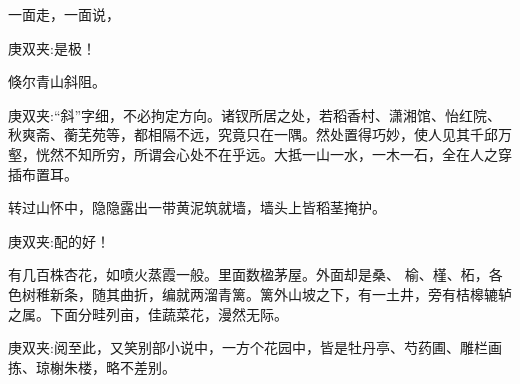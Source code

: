 \begin{parag}
    一面走，一面说，\begin{note}庚双夹:是极！\end{note}倏尔青山斜阻。\begin{note}庚双夹:“斜”字细，不必拘定方向。诸钗所居之处，若稻香村、潇湘馆、怡红院、秋爽斋、蘅芜苑等，都相隔不远，究竟只在一隅。然处置得巧妙，使人见其千邱万壑，恍然不知所穷，所谓会心处不在乎远。大抵一山一水，一木一石，全在人之穿插布置耳。\end{note}转过山怀中，隐隐露出一带黄泥筑就墙，墙头上皆稻茎掩护。\begin{note}庚双夹:配的好！\end{note}有几百株杏花，如喷火蒸霞一般。里面数楹茅屋。外面却是桑、 榆、槿、柘，各色树稚新条，随其曲折，编就两溜青篱。篱外山坡之下，有一土井，旁有桔槔辘轳之属。下面分畦列亩，佳蔬菜花，漫然无际。\begin{note}庚双夹:阅至此，又笑别部小说中，一方个花园中，皆是牡丹亭、芍药圃、雕栏画拣、琼榭朱楼，略不差别。\end{note}
\end{parag}


